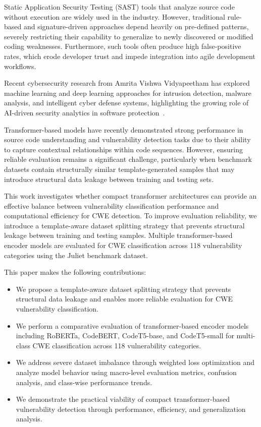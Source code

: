 \documentclass[conference]{IEEEtran}
\begin{document}
Static Application Security Testing (SAST) tools that analyze source code without execution are widely used in the industry. However, traditional rule-based and signature-driven approaches depend heavily on pre-defined patterns, severely restricting their capability to generalize to newly discovered or modified coding weaknesses. Furthermore, such tools often produce high false-positive rates, which erode developer trust and impede integration into agile development workflows.

Recent cybersecurity research from Amrita Vishwa Vidyapeetham has explored machine learning and deep learning approaches for intrusion detection, malware analysis, and intelligent cyber defense systems, highlighting the growing role of AI-driven security analytics in software protection~\cite{amrita1,amrita2,amrita3,amrita4,amrita5,amrita6}.

Transformer-based models have recently demonstrated strong performance in source code understanding and vulnerability detection tasks due to their ability to capture contextual relationships within code sequences. However, ensuring reliable evaluation remains a significant challenge, particularly when benchmark datasets contain structurally similar template-generated samples that may introduce structural data leakage between training and testing sets.

This work investigates whether compact transformer architectures can provide an effective balance between vulnerability classification performance and computational efficiency for CWE detection. To improve evaluation reliability, we introduce a template-aware dataset splitting strategy that prevents structural leakage between training and testing samples. Multiple transformer-based encoder models are evaluated for CWE classification across 118 vulnerability categories using the Juliet benchmark dataset.

This paper makes the following contributions:
\begin{itemize}
    \item We propose a template-aware dataset splitting strategy that prevents structural data leakage and enables more reliable evaluation for CWE vulnerability classification.
    
    \item We perform a comparative evaluation of transformer-based encoder models including RoBERTa, CodeBERT, CodeT5-base, and CodeT5-small for multi-class CWE classification across 118 vulnerability categories.

    \item We address severe dataset imbalance through weighted loss optimization and analyze model behavior using macro-level evaluation metrics, confusion analysis, and class-wise performance trends.

    \item We demonstrate the practical viability of compact transformer-based vulnerability detection through performance, efficiency, and generalization analysis.
\end{itemize}
\end{document}
